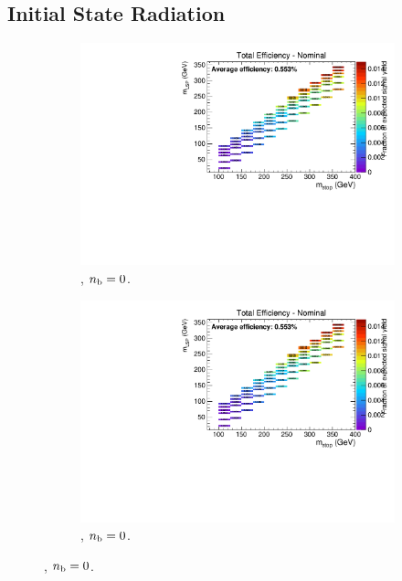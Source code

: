 \newpage
\subsection*{Initial State Radiation}
\label{sec:t2cc_isr_plots}

\begin{figure}[ht!]
  \centering
  \begin{subfigure}[b]{0.32\textwidth}
    \includegraphics[width=\textwidth, page=4]{Figs/sms/t2cc/v24/ISR_T2cc_v24_eq0b_le3j_incl.pdf}
    \caption{\njlow, $n_{\text{b}} = 0$.}
  \end{subfigure}
  \begin{subfigure}[b]{0.32\textwidth}
    \includegraphics[width=\textwidth, page=5]{Figs/sms/t2cc/v24/ISR_T2cc_v24_eq0b_le3j_incl.pdf}
    \caption{\njlow, $n_{\text{b}} = 0$.}
  \end{subfigure}

\end{figure}

